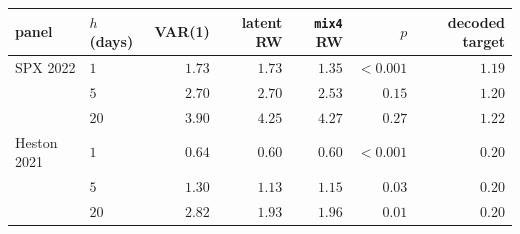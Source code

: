 \begin{tabular}{llrrrrr}
\toprule
panel & $h$ (days) & VAR(1) & latent RW & \texttt{mix4} RW & $p$ & decoded target \\
\midrule
SPX 2022 & $1$ & $1.73$ & $1.73$ & $\mathbf{1.35}$ & $<0.001$ & $1.19$ \\
 & $5$ & $2.70$ & $2.70$ & $\mathbf{2.53}$ & $0.15$ & $1.20$ \\
 & $20$ & $\mathbf{3.90}$ & $4.25$ & $4.27$ & $0.27$ & $1.22$ \\
Heston 2021 & $1$ & $0.64$ & $\mathbf{0.60}$ & $0.60$ & $<0.001$ & $0.20$ \\
 & $5$ & $1.30$ & $\mathbf{1.13}$ & $1.15$ & $0.03$ & $0.20$ \\
 & $20$ & $2.82$ & $\mathbf{1.93}$ & $1.96$ & $0.01$ & $0.20$ \\
\bottomrule
\end{tabular}
